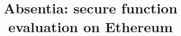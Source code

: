 \documentclass[envcountsect]{llncs}
\begin{document}
	
\frontmatter
\mainmatter

\title{\Large \bf Absentia: secure function evaluation on Ethereum}


\maketitle












\clearpage
\appendix
\end{document}

